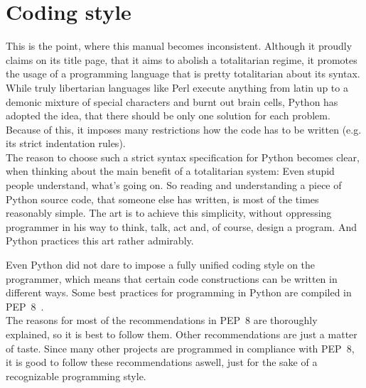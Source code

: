 	\section{Coding style}
		This is the point, where this manual becomes inconsistent.
		Although it proudly claims on its title page, that it aims to abolish a totalitarian regime, it promotes the usage of a programming language that is pretty totalitarian about its syntax.\\
		While truly libertarian languages like Perl execute anything from latin up to a demonic mixture of special characters and burnt out brain cells, Python has adopted the idea, that there should be only one solution for each problem.
		Because of this, it imposes many restrictions how the code has to be written (e.g. its strict indentation rules).\\
		The reason to choose such a strict syntax specification for Python becomes clear, when thinking about the main benefit of a totalitarian system:
		Even stupid people understand, what's going on.
		So reading and understanding a piece of Python source code, that someone else has written, is most of the times reasonably simple.
		The art is to achieve this simplicity, without oppressing programmer in his way to think, talk, act and, of course, design a program.
		And Python practices this art rather admirably.

		Even Python did not dare to impose a fully unified coding style on the programmer, which means that certain code constructions can be written in different ways.
		Some best practices for programming in Python are compiled in PEP~8~\cite{PEP8}.\\
		The reasons for most of the recommendations in PEP~8 are thoroughly explained, so it is best to follow them.
		Other recommendations are just a matter of taste.
		Since many other projects are programmed in compliance with PEP~8, it is good to follow these recommendations aswell, just for the sake of a recognizable programming style.

